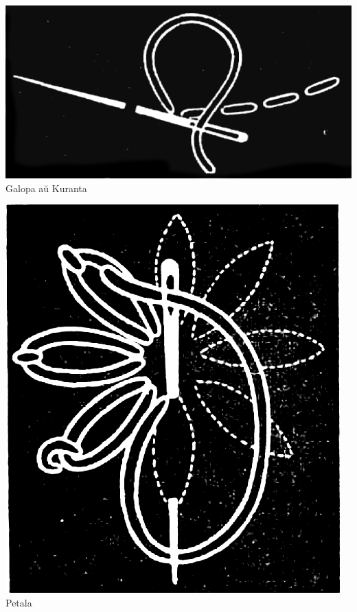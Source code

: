 \begin{center}\includegraphics[keepaspectratio,width=\textwidth,height=0.75\textheight]{3.png}\\
Galopa aŭ Kuranta\end{center}

\begin{center}\includegraphics[keepaspectratio,width=\textwidth,height=0.75\textheight]{4.png}\\
Petala\end{center}

